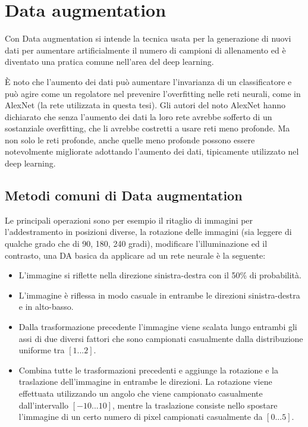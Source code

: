 \chapter{Data augmentation}\label{data-augmentation}

Con Data augmentation si intende la tecnica usata per la generazione di nuovi dati  per aumentare artificialmente il numero di campioni di allenamento ed è diventato una pratica comune nell'area del deep learning.

È noto che l'aumento dei dati può aumentare l'invarianza di un classificatore e può agire come un regolatore nel prevenire l'overfitting nelle reti neurali, come in AlexNet (la rete utilizzata in questa tesi). Gli autori del noto AlexNet  hanno dichiarato che senza l'aumento dei dati la loro rete avrebbe sofferto di un sostanziale overfitting, che li avrebbe costretti a usare reti meno profonde\cite{alexnet}. Ma non solo le reti profonde, anche quelle meno profonde  possono essere notevolmente migliorate adottando l'aumento dei dati, tipicamente utilizzato nel deep learning\cite{dataaugmentation}.


\section{Metodi comuni di Data augmentation}\label{metodi-comuni-di-data-augmentation}

Le principali operazioni sono per esempio  il ritaglio di immagini
per l'addestramento in posizioni diverse, la rotazione delle immagini (sia leggere di qualche grado che di 90, 180, 240 gradi), modificare l'illuminazione ed il contrasto, una DA basica da applicare ad un rete neurale è la seguente\cite{nanni_dtc_pca}:
\begin{itemize}
    \item L'immagine si riflette nella direzione sinistra-destra con il 50\% di probabilità. 
    \item L'immagine è riflessa in modo casuale in entrambe le direzioni sinistra-destra e in alto-basso.
    \item Dalla trasformazione precedente l'immagine viene scalata lungo entrambi gli assi di due diversi fattori che sono
    campionati casualmente dalla distribuzione uniforme tra \([1...2]\).
    \item Combina tutte le trasformazioni precedenti  e aggiunge la rotazione e la traslazione dell'immagine in entrambe le
    direzioni. La rotazione viene effettuata utilizzando un angolo che viene campionato casualmente dall'intervallo
    \([-10...10]\), mentre la traslazione consiste nello spostare l'immagine di un certo numero di pixel
    campionati casualmente da \([0...5]\).
\end{itemize}

